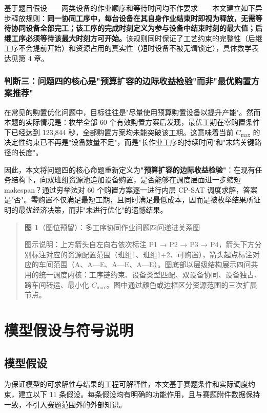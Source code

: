 \documentclass[UTF8,a4paper,12pt]{ctexart}
\begin{document}
基于题目假设——两类设备的作业顺序和等待时间均不作要求——本文建立如下异步释放规则：\textbf{同一协同工序中，每台设备在其自身作业结束时即视为释放，无需等待协同设备全部完工；该工序的完成时刻定义为参与设备中结束时刻的最大值；后继工序必须等待该最大时刻方可开始。}该规则同时保证了工艺约束的完整性（后继工序不会提前开始）和资源占用的真实性（短时设备不被无谓锁定），具体数学表达见第 4 章。

\subsubsection{判断三：问题四的核心是"预算扩容的边际收益检验"而非"最优购置方案推荐"}
在常见的购置优化问题中，目标往往是"尽量使用预算购置设备以提升产能"。然而本题的实际情况是：枚举全部 60 个有效购置方案后发现，最优工期在零购置条件下已经达到 123,844 秒，全部购置方案均未能突破该工期。这意味着当前 $C_{\max}$ 的决定性约束已不再是"设备数量不足"，而是"长作业工序的持续时间"和"末端关键路径的长度"。

因此，本文将问题四的核心命题重新定义为\textbf{"预算扩容的边际收益检验"}：在现有任务结构下，向双班组资源池追加设备购置，是否能够在调度层面进一步缩短 makespan？通过穷举法对 60 个购置方案逐一进行内层 CP-SAT 调度求解，答案是"否"。零购置不仅满足最短工期，且同时满足最低成本，因而是被枚举结果所证明的最优经济决策，而非"未进行优化"的遗憾结果。

\begin{quote}
\textbf{图 1}（图位预留）：多工序协同作业问题四问递进关系图

图示说明：上方箭头自左向右依次标注 P1 → P2 → P3 → P4，箭头下方分别标注对应的资源配置范围（班组1、班组1+2、可购置），箭头起点标注对应的车间范围（A、A—E、A—E、A—E）。图底部以层级结构展示四问共用的统一调度内核：工序链约束、设备类型匹配、双设备协同、设备独占、跨车间转运、最小化 $C_{\max}$。图中通过颜色或边框区分资源范围的三次扩展节点。
\end{quote}


\section{模型假设与符号说明}

\subsection{模型假设}
为保证模型的可求解性与结果的工程可解释性，本文基于赛题条件和实际调度约束，建立以下 11 条假设。每条假设均有明确的功能作用，且与赛题附件数据保持一致，不引入赛题范围外的外部知识。
\end{document}
